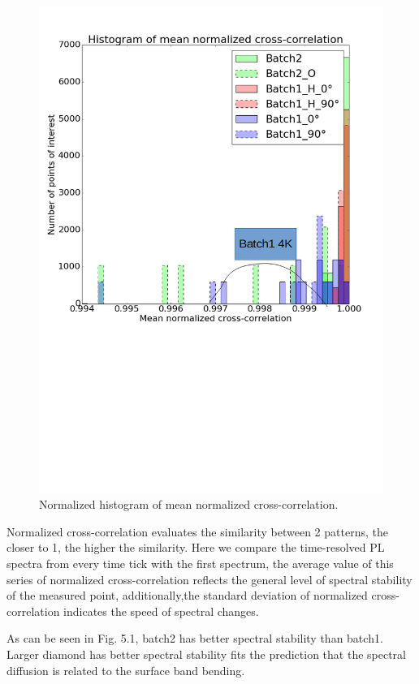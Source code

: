 \begin{figure}[h]
	\centering
	\includegraphics[width=1\linewidth]{Figures/pic/histall}
	\caption{Normalized histogram of mean normalized cross-correlation.}
	\label{fig:2015-09-07-ow-capture-20150907151210-744-1}
\end{figure}

Normalized cross-correlation evaluates the similarity between 2 patterns, the closer to 1, the higher the similarity. Here we compare the time-resolved PL spectra from every time tick with the first spectrum, the average value of this series of normalized cross-correlation reflects the general level of spectral stability of the measured point, additionally,the standard deviation of normalized cross-correlation indicates the speed of spectral changes.

As can be seen in Fig. 5.1, batch2 has better spectral stability than batch1. Larger diamond has better spectral stability fits the prediction that the spectral diffusion is related to the surface band bending. 

